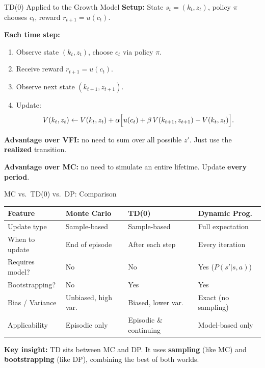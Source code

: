 \documentclass[10pt,english,aspectratio=169]{beamer}
\begin{document}
\begin{frame}{TD(0) Applied to the Growth Model}
  \textbf{Setup:} State $s_t = (k_t, z_t)$, policy $\pi$ chooses $c_t$, reward $r_{t+1} = u(c_t)$.

  \vspace{0.3cm}
  \textbf{Each time step:}
  \begin{enumerate}
      \item Observe state $(k_t, z_t)$, choose $c_t$ via policy $\pi$.
      \item Receive reward $r_{t+1} = u(c_t)$.
      \item Observe next state $(k_{t+1}, z_{t+1})$.
      \item Update:
      \[
        V(k_t, z_t) \leftarrow V(k_t, z_t) + \alpha \Bigl[u(c_t) + \beta\, V(k_{t+1}, z_{t+1}) - V(k_t, z_t)\Bigr].
      \]
  \end{enumerate}

  \vspace{0.3cm}
  \textbf{Advantage over VFI:} no need to sum over all possible $z'$. Just use the \textbf{realized} transition.

  \textbf{Advantage over MC:} no need to simulate an entire lifetime. Update \textbf{every period}.
\end{frame}


\begin{frame}{MC vs.\ TD(0) vs.\ DP: Comparison}
\footnotesize
\begin{center}
    \begin{tabular}{p{2.4cm} p{3.2cm} p{3.2cm} p{3.2cm}}
    \toprule
    \textbf{Feature} & \textbf{Monte Carlo} & \textbf{TD(0)} & \textbf{Dynamic Prog.} \\
    \midrule
    Update type & Sample-based & Sample-based & Full expectation \\
    When to update & End of episode & After each step & Every iteration \\
    Requires model? & No & No & Yes ($P(s'|s,a)$) \\
    Bootstrapping? & No & Yes & Yes \\
    Bias / Variance & Unbiased, high var. & Biased, lower var. & Exact (no sampling) \\
    Applicability & Episodic only & Episodic \& continuing & Model-based only \\
    \bottomrule
    \end{tabular}
\end{center}

\vspace{0.3cm}
\normalsize
\textbf{Key insight:} TD sits between MC and DP. It uses \textbf{sampling} (like MC) and \textbf{bootstrapping} (like DP), combining the best of both worlds.
\end{frame}
\end{document}
